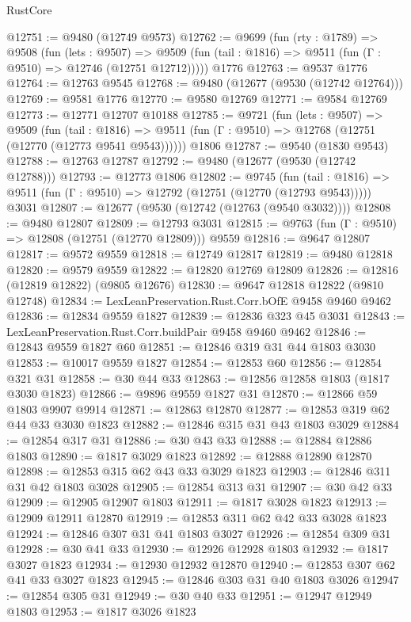 \begin{lexlean}{RustCore}
\begin{coremodule}
@12751 := @9480 (@12749 @9573)
@12762 := @9699
    (fun (rty : @1789) =>
    @9508
      (fun (lets : @9507) =>
      @9509 (fun (tail : @1816) => @9511 (fun (Γ : @9510) => @12746 (@12751 @12712)))))
    @1776
@12763 := @9537 @1776
@12764 := @12763 @9545
@12768 := @9480 (@12677 (@9530 (@12742 @12764)))
@12769 := @9581 @1776
@12770 := @9580 @12769
@12771 := @9584 @12769
@12773 := @12771 @12707 @10188
@12785 := @9721
    (fun (lets : @9507) =>
    @9509
      (fun (tail : @1816) =>
      @9511 (fun (Γ : @9510) => @12768 (@12751 (@12770 (@12773 @9541 @9543))))))
    @1806
@12787 := @9540 (@1830 @9543)
@12788 := @12763 @12787
@12792 := @9480 (@12677 (@9530 (@12742 @12788)))
@12793 := @12773 @1806
@12802 := @9745
    (fun (tail : @1816) => @9511 (fun (Γ : @9510) => @12792 (@12751 (@12770 (@12793 @9543)))))
    @3031
@12807 := @12677 (@9530 (@12742 (@12763 (@9540 @3032))))
@12808 := @9480 @12807
@12809 := @12793 @3031
@12815 := @9763 (fun (Γ : @9510) => @12808 (@12751 (@12770 @12809))) @9559
@12816 := @9647 @12807
@12817 := @9572 @9559
@12818 := @12749 @12817
@12819 := @9480 @12818
@12820 := @9579 @9559
@12822 := @12820 @12769 @12809
@12826 := @12816 (@12819 @12822) (@9805 @12676)
@12830 := @9647 @12818 @12822 (@9810 @12748)
@12834 := LexLeanPreservation.Rust.Corr.bOfE @9458 @9460 @9462
@12836 := @12834 @9559 @1827
@12839 := @12836 @323 @45 @3031
@12843 := LexLeanPreservation.Rust.Corr.buildPair @9458 @9460 @9462
@12846 := @12843 @9559 @1827 @60
@12851 := @12846 @319 @31 @44 @1803 @3030
@12853 := @10017 @9559 @1827
@12854 := @12853 @60
@12856 := @12854 @321 @31
@12858 := @30 @44 @33
@12863 := @12856 @12858 @1803 (@1817 @3030 @1823)
@12866 := @9896 @9559 @1827 @31
@12870 := @12866 @59 @1803 @9907 @9914
@12871 := @12863 @12870
@12877 := @12853 @319 @62 @44 @33 @3030 @1823
@12882 := @12846 @315 @31 @43 @1803 @3029
@12884 := @12854 @317 @31
@12886 := @30 @43 @33
@12888 := @12884 @12886 @1803
@12890 := @1817 @3029 @1823
@12892 := @12888 @12890 @12870
@12898 := @12853 @315 @62 @43 @33 @3029 @1823
@12903 := @12846 @311 @31 @42 @1803 @3028
@12905 := @12854 @313 @31
@12907 := @30 @42 @33
@12909 := @12905 @12907 @1803
@12911 := @1817 @3028 @1823
@12913 := @12909 @12911 @12870
@12919 := @12853 @311 @62 @42 @33 @3028 @1823
@12924 := @12846 @307 @31 @41 @1803 @3027
@12926 := @12854 @309 @31
@12928 := @30 @41 @33
@12930 := @12926 @12928 @1803
@12932 := @1817 @3027 @1823
@12934 := @12930 @12932 @12870
@12940 := @12853 @307 @62 @41 @33 @3027 @1823
@12945 := @12846 @303 @31 @40 @1803 @3026
@12947 := @12854 @305 @31
@12949 := @30 @40 @33
@12951 := @12947 @12949 @1803
@12953 := @1817 @3026 @1823

\end{coremodule}
\end{lexlean}
